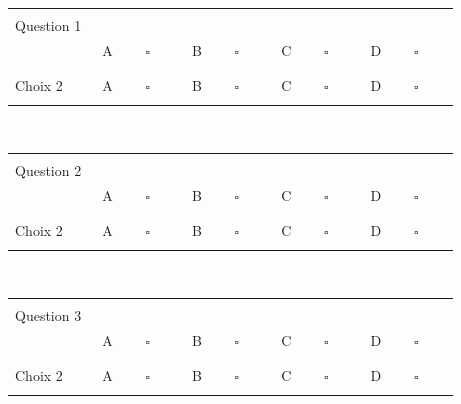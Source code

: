 \documentclass{book}%
\begin{document}
\begin{center}%
\begin{tabular}{| l l l l l |}%
\hline%
 & & & & \\%
Question 1\qquad \qquad\ & & & & \\%
 & A $\qquad \square \qquad$ & B $\qquad \square \qquad$ & C $\qquad \square \qquad$ & D $\qquad \square \qquad$ \\ %
 & & & &  \\%
\hline%
 & & & &  \\%
Choix 2 & A $\qquad \square \qquad$ & B $\qquad \square \qquad$ & C $\qquad \square \qquad$ & D $\qquad \square \qquad$ \\ %
 & & & &  \\%
\hline%
\end{tabular}%
\\ \vskip3mm%
\thispagestyle{empty}%
\begin{tabular}{| l l l l l |}%
\hline%
 & & & & \\%
Question 2\qquad \qquad\ & & & & \\%
 & A $\qquad \square \qquad$ & B $\qquad \square \qquad$ & C $\qquad \square \qquad$ & D $\qquad \square \qquad$ \\ %
 & & & &  \\%
\hline%
 & & & &  \\%
Choix 2 & A $\qquad \square \qquad$ & B $\qquad \square \qquad$ & C $\qquad \square \qquad$ & D $\qquad \square \qquad$ \\ %
 & & & &  \\%
\hline%
\end{tabular}%
\\ \vskip3mm%
\thispagestyle{empty}%
\begin{tabular}{| l l l l l |}%
\hline%
 & & & & \\%
Question 3\qquad \qquad\ & & & & \\%
 & A $\qquad \square \qquad$ & B $\qquad \square \qquad$ & C $\qquad \square \qquad$ & D $\qquad \square \qquad$ \\ %
 & & & &  \\%
\hline%
 & & & &  \\%
Choix 2 & A $\qquad \square \qquad$ & B $\qquad \square \qquad$ & C $\qquad \square \qquad$ & D $\qquad \square \qquad$ \\ %
 & & & &  \\%
\hline%
\end{tabular}%
\\ \vskip3mm%
\thispagestyle{empty}%
\begin{tabular}{| l l l l l |}%

\end{tabular}
\end{center}
\end{document}
